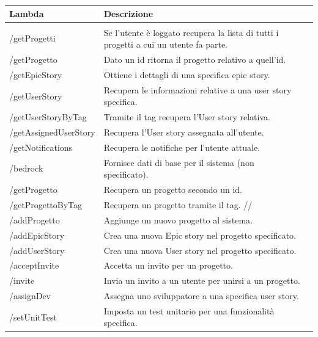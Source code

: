 \documentclass{article}
\begin{document}
\begin{center}
\begin{tabular}{|P{7cm}| P{10cm}|}
\hline
{}
Lambda & Descrizione \\
\hline
{}
 \\
\hline
{}
/getProgetti & Se l'utente è loggato recupera la lista di tutti i progetti a cui un utente fa parte. \\
\hline
{}
/getProgetto & Dato un id ritorna il progetto relativo a quell'id. \\
\hline
{}
/getEpicStory & Ottiene i dettagli di una specifica epic story. \\
\hline
{}
/getUserStory & Recupera le informazioni relative a una user story specifica. \\
\hline
{}
/getUserStoryByTag & Tramite il tag recupera l'User story relativa. \\
\hline
{}
/getAssignedUserStory & Recupera l'User story assegnata all'utente. \\
\hline
{}
/getNotifications & Recupera le notifiche per l'utente attuale. \\
\hline
{}
/bedrock & Fornisce dati di base per il sistema (non specificato). \\
\hline
{}
/getProgetto & Recupera un progetto secondo un id. \\
\hline
{}
/getProgettoByTag & Recupera un progetto tramite il tag. //
\hline
{} \\
\hline
{}
/addProgetto & Aggiunge un nuovo progetto al sistema. \\
\hline
{}
/addEpicStory & Crea una nuova Epic story nel progetto specificato. \\
\hline
{}
/addUserStory & Crea una nuova User story nel progetto specificato. \\
\hline
{}
/acceptInvite & Accetta un invito per un progetto. \\
\hline
{}
/invite & Invia un invito a un utente per unirsi a un progetto. \\
\hline
{}
/assignDev & Assegna uno sviluppatore a una specifica user story. \\
\hline
{}
/setUnitTest & Imposta un test unitario per una funzionalità specifica. \\

\end{tabular}
\end{center}
\end{document}

